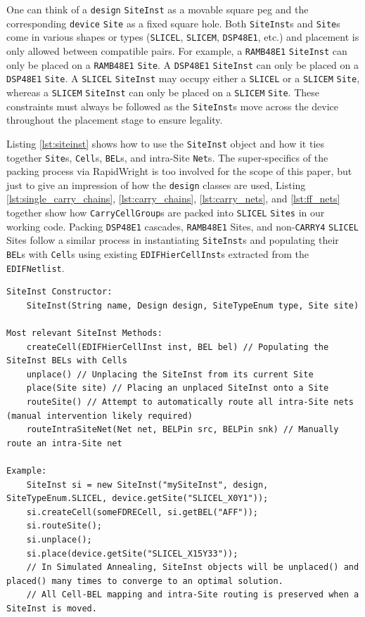 \begin{multicols}{2}
One can think of a \texttt{design} \texttt{SiteInst} as a movable square peg and the corresponding \texttt{device} \texttt{Site} as a fixed square hole. 
Both \texttt{SiteInst}s and \texttt{Site}s come in various shapes or types (\texttt{SLICEL}, \texttt{SLICEM}, \texttt{DSP48E1}, etc.) and placement is only allowed between compatible pairs. 
For example, a \texttt{RAMB48E1} \texttt{SiteInst} can only be placed on a \texttt{RAMB48E1} \texttt{Site}.
A \texttt{DSP48E1} \texttt{SiteInst} can only be placed on a \texttt{DSP48E1} \texttt{Site}.
A \texttt{SLICEL} \texttt{SiteInst} may occupy either a \texttt{SLICEL} or a \texttt{SLICEM} \texttt{Site}, whereas a \texttt{SLICEM} \texttt{SiteInst} can only be placed on a \texttt{SLICEM} \texttt{Site}.
These constraints must always be followed as the \texttt{SiteInst}s move across the device throughout the placement stage to ensure legality. 

Listing \ref{lst:siteinst} shows how to use the \texttt{SiteInst} object and how it ties together \texttt{Site}s, \texttt{Cell}s, \texttt{BEL}s, and intra-Site \texttt{Net}s. 
The super-specifics of the packing process via RapidWright is too involved for the scope of this paper, but just to give an impression of how the \texttt{design} classes are used, Listing \ref{lst:single_carry_chains}, \ref{lst:carry_chains}, \ref{lst:carry_nets}, and \ref{lst:ff_nets} together show how \texttt{CarryCellGroup}s are packed into \texttt{SLICEL} \texttt{Sites} in our working code. 
Packing \texttt{DSP48E1} cascades, \texttt{RAMB48E1} Sites, and non-\texttt{CARRY4} \texttt{SLICEL} Sites follow a similar process in instantiating \texttt{SiteInst}s and populating their \texttt{BEL}s with \texttt{Cell}s using existing \texttt{EDIFHierCellInst}s extracted from the \texttt{EDIFNetlist}.



\end{multicols}
\begin{lstlisting}[caption={\texttt{SiteInst} constructor and methods.}, label={lst:siteinst}]
SiteInst Constructor: 
    SiteInst(String name, Design design, SiteTypeEnum type, Site site)

Most relevant SiteInst Methods:
    createCell(EDIFHierCellInst inst, BEL bel) // Populating the SiteInst BELs with Cells
    unplace() // Unplacing the SiteInst from its current Site
    place(Site site) // Placing an unplaced SiteInst onto a Site
    routeSite() // Attempt to automatically route all intra-Site nets (manual intervention likely required)
    routeIntraSiteNet(Net net, BELPin src, BELPin snk) // Manually route an intra-Site net

Example:
    SiteInst si = new SiteInst("mySiteInst", design, SiteTypeEnum.SLICEL, device.getSite("SLICEL_X0Y1"));
    si.createCell(someFDRECell, si.getBEL("AFF"));
    si.routeSite();
    si.unplace();
    si.place(device.getSite("SLICEL_X15Y33"));
    // In Simulated Annealing, SiteInst objects will be unplaced() and placed() many times to converge to an optimal solution. 
    // All Cell-BEL mapping and intra-Site routing is preserved when a SiteInst is moved. 

\end{lstlisting}


